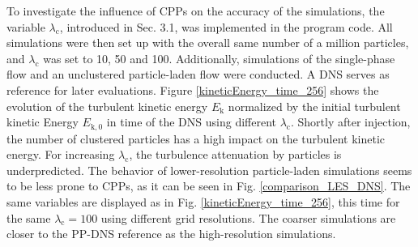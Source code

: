 \documentclass[11pt,a4paper,openany,oneside,parskip=half*]{article}
\begin{document}
To investigate the influence of CPPs on the accuracy of the simulations, the variable $\lambda_\mathrm{c}$, introduced in Sec. 3.1, was implemented in the program code. All simulations were then set up with the overall same number of a million particles, and $\lambda_\mathrm{c}$ was set to 10, 50 and 100. Additionally, simulations of the single-phase flow and an unclustered particle-laden flow were conducted. A DNS serves as reference for later evaluations. 
\newline %
Figure \ref{kineticEnergy_time_256} shows the evolution of the turbulent kinetic energy $E_\mathrm{k}$ normalized by the initial turbulent kinetic Energy $E_\mathrm{k,0}$ in time of the DNS using different $\lambda_\mathrm{c}$. Shortly after injection, the number of clustered particles has a high impact on the turbulent kinetic energy. For increasing $\lambda_\mathrm{c}$, the turbulence attenuation by particles is underpredicted.
\newline %
The behavior of lower-resolution particle-laden simulations seems to be less prone to CPPs, as it can be seen in Fig. \ref{comparison_LES_DNS}. The same variables are displayed as in Fig. \ref{kineticEnergy_time_256}, this time for the same $\lambda_\mathrm{c}=100$ using different grid resolutions. The coarser simulations are closer to the PP-DNS reference as the high-resolution simulations.
\end{document}
